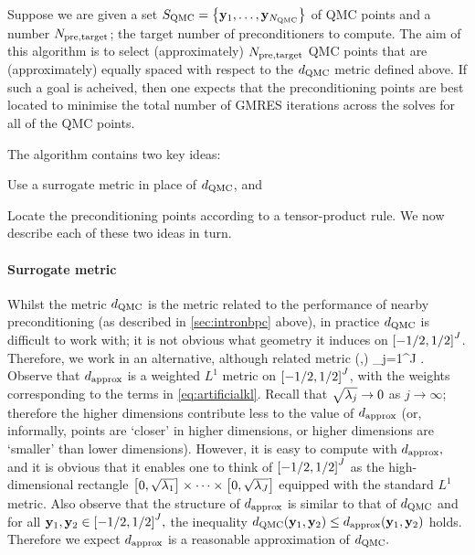 Suppose we are given a set $\SQMC = \set{\byo,\ldots,\byNQMC}$ of QMC points and a number $N_{\mathrm{pre,target}}$; the target number of preconditioners to compute. The aim of this algorithm is to select (approximately) $N_{\mathrm{pre,target}}$ QMC points that are (approximately) equally spaced with respect to the $d_{\mathrm{QMC}}$ metric defined above. If such a goal is acheived, then one expects that the preconditioning points are best located to minimise the total number of GMRES iterations across the solves for all of the QMC points.

The algorithm contains two key ideas:
\ben
  \item Use a surrogate metric in place of $d_{\mathrm{QMC}}$, and
\item Locate the preconditioning points according to a tensor-product rule.
  \een
  We now describe each of these two ideas in turn.

\paragraph{Surrogate metric} Whilst the metric $d_{\mathrm{QMC}}$ is the metric related to the performance of nearby preconditioning (as described in \cref{sec:intronbpc} above), in practice $d_{\mathrm{QMC}}$ is difficult to work with; it is not obvious what geometry it induces on $\cube{J}$. Therefore, we work in an alternative, although related metric
  \beqs
\dapprox(\byo,\byt) \de \sum_{j=1}^{J} \sqrt{\lambdaj} .
\eeqs
Observe that $d_{\mathrm{approx}}$ is a weighted $L^1$ metric on $\cube{J}$, with the weights corresponding to the terms in \cref{eq:artificialkl}. Recall that $\sqrt{\lambda_{j}} \rightarrow 0$ as $j \rightarrow \infty$; therefore the higher dimensions contribute less to the value of $d_{\mathrm{approx}}$ (or, informally, points are `closer' in higher dimensions, or higher dimensions are `smaller' than lower dimensions). However, it is easy to compute with $d_{\mathrm{approx}},$ and it is obvious that it enables one to think of $\cube{J}$ as the high-dimensional rectangle $\mleft[0,\sqrt{\lambdao}\mright]\times\cdots\times\mleft[0,\sqrt{\lambdaJ}\mright]$ equipped with the standard $L^1$ metric. Also observe that the structure of $d_{\mathrm{approx}}$ is similar to that of $d_{\mathrm{QMC}}$ and for all $\byo,\byt \in \cube{J},$ the inequality $\dQMC\mleft(\byo,\byt\mright) \leq \dapprox\mleft(\byo,\byt\mright)$ holds. Therefore we expect $d_{\mathrm{approx}}$ is a reasonable approximation of $d_{\mathrm{QMC}}.$

